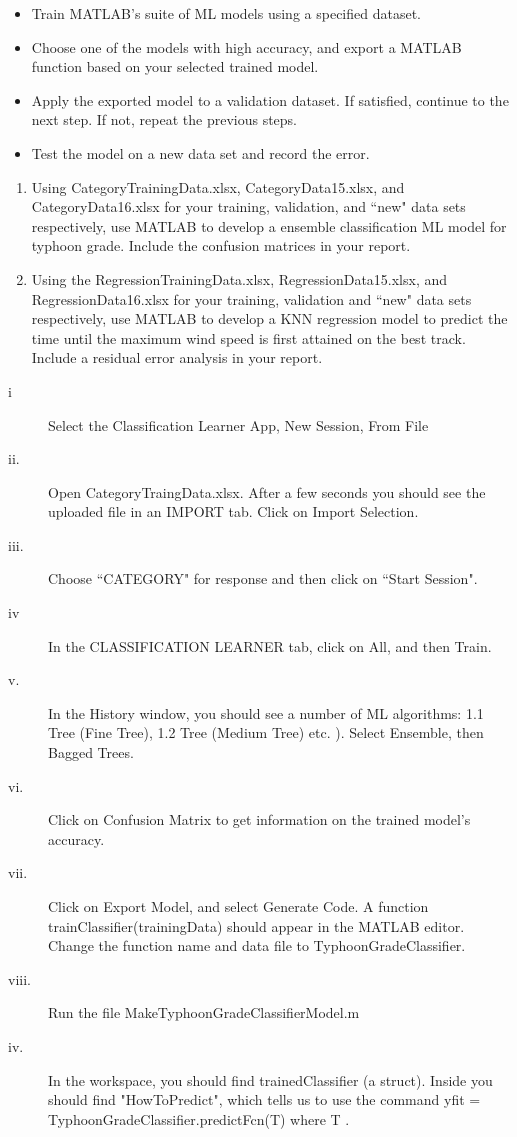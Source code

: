 \documentclass{SBCbookchapter}
\begin{document}
	\begin{itemize}
		\item Train MATLAB's suite of ML models using a specified dataset.
		\item Choose one of the models with high accuracy, and export a MATLAB function based on your selected trained model.
		\item Apply the exported model to a validation dataset.
		If satisfied, continue to the next step. If not, repeat the previous steps.
		\item Test the model on a new data set and record the error. 
	\end{itemize} 
	
	\begin{enumerate}
		\item Using CategoryTrainingData.xlsx,  CategoryData15.xlsx, and CategoryData16.xlsx for your training, validation, and ``new" data sets respectively, use MATLAB to develop a ensemble classification ML model for typhoon grade. Include the confusion matrices in your report. 
		
		\item Using the RegressionTrainingData.xlsx, RegressionData15.xlsx, and RegressionData16.xlsx for your training, validation and ``new" data sets respectively, use MATLAB to develop  a KNN regression model to predict the time until the maximum wind speed is first attained on the best track. Include a residual error analysis in your report.
	\end{enumerate}
	
	
	\begin{description}
		\item[i] Select the Classification Learner App, New Session, From File
		\item[ii.] Open CategoryTraingData.xlsx. After a few seconds you should see the uploaded file in an IMPORT tab.  Click on Import Selection.
		\item[iii.] Choose ``CATEGORY" for response and then click on ``Start Session".
		\item[iv] In the CLASSIFICATION LEARNER tab, click on All, and then Train.
		\item[v.] In the History window, you should see a number of ML algorithms: 1.1 Tree (Fine Tree), 1.2 Tree (Medium Tree) etc. ). Select Ensemble, then Bagged Trees.
		\item[vi.]  Click on Confusion Matrix to get information on the trained model's accuracy.
		\item[vii.] Click on Export Model, and select Generate Code.  A function trainClassifier(trainingData) should appear in the MATLAB editor.  Change the function name and data file to TyphoonGradeClassifier.
		\item[viii.] Run the file MakeTyphoonGradeClassifierModel.m
		\item[iv.] In the workspace, you should find trainedClassifier (a struct). Inside you should find "HowToPredict", which tells us to use the command   yfit = TyphoonGradeClassifier.predictFcn(T) where T .
	\end{description}
	
\end{document}
